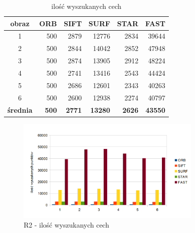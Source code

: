 \begin{table}[htbp]
  \centering
  \caption{ilość wyszukanych cech}
    \begin{tabular}{|c|r|r|r|r|r|}\hline
    
    obraz & \textbf{ORB} & \textbf{SIFT} & \textbf{SURF} & \textbf{STAR} & \textbf{FAST} \\\hline
    
   
    1 & 500 & 2879 & 12776 & 2834 & 39644 \\
    2 & 500 & 2844 & 14042 & 2852 & 47948 \\
    3 & 500 & 2874 & 13905 & 2912 & 48224 \\
    4 & 500 & 2741 & 13416 & 2543 & 44424 \\
    5 & 500 & 2686 & 12601 & 2343 & 40263 \\
    6 & 500 & 2600 & 12938 & 2274 & 40797 \\\hline
    \textbf{średnia} & \textbf{500} & \textbf{2771} & \textbf{13280} & \textbf{2626} & \textbf{43550} \\
    \hline
    \end{tabular}%
  \label{tab:r2_f1}%
\end{table}%


\begin{figure}
\centering
\includegraphics[width=0.8\textwidth]{pict/slowik/r2/F1.png}
\caption{R2 - ilość wyszukanych cech}
\label{fig:r2_f1}
\end{figure}


